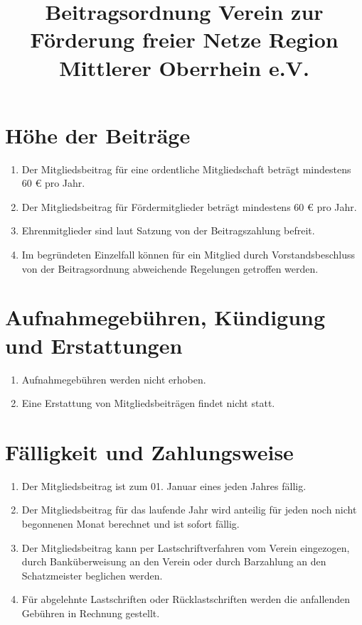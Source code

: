 \documentclass[12pt,a4paper,titlepage]{scrartcl}
\title{Beitragsordnung Verein zur Förderung freier Netze Region Mittlerer Oberrhein e.V.}
\begin{document}
\maketitle
{}
\thispagestyle{empty}
\newpage
{}
\setcounter{page}{1}

\section{Höhe der Beiträge}
\begin{enumerate}
\item Der Mitgliedsbeitrag für eine ordentliche Mitgliedschaft beträgt mindestens 60 € pro Jahr.
\item Der Mitgliedsbeitrag für Fördermitglieder beträgt mindestens 60 € pro Jahr.
\item Ehrenmitglieder sind laut Satzung von der Beitragszahlung befreit.
\item Im begründeten Einzelfall können für ein Mitglied durch Vorstandsbeschluss von der Beitragsordnung abweichende Regelungen getroffen werden.
\end{enumerate}
	
\section{Aufnahmegebühren, Kündigung und Erstattungen}
\begin{enumerate}
\item Aufnahmegebühren werden nicht erhoben.
\item Eine Erstattung von Mitgliedsbeiträgen findet nicht statt.
\end{enumerate}


\section{Fälligkeit und Zahlungsweise}
\begin{enumerate}
\item Der Mitgliedsbeitrag ist zum 01. Januar eines jeden Jahres fällig.
\item Der Mitgliedsbeitrag für das laufende Jahr wird anteilig für jeden noch nicht begonnenen Monat berechnet und ist sofort fällig.
\item Der Mitgliedsbeitrag kann per Lastschriftverfahren vom Verein eingezogen, durch Banküberweisung an den Verein oder durch Barzahlung an den Schatzmeister beglichen werden.
\item Für abgelehnte Lastschriften oder Rücklastschriften werden die anfallenden Gebühren in Rechnung gestellt.
\end{enumerate}
\end{document}
